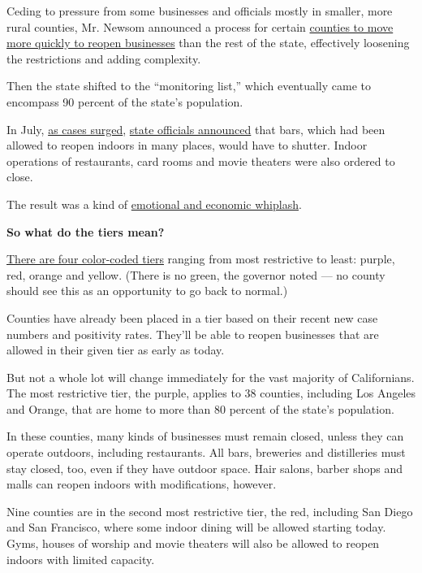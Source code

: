 Ceding to pressure from some businesses and officials mostly in smaller,
more rural counties, Mr. Newsom announced a process for certain
\href{https://www.nytimes3xbfgragh.onion/2020/05/19/us/california-reopening.html}{counties
to move more quickly to reopen businesses} than the rest of the state,
effectively loosening the restrictions and adding complexity.

Then the state shifted to the ``monitoring list,'' which eventually came
to encompass 90 percent of the state's population.

In July,
\href{https://www.nytimes3xbfgragh.onion/2020/07/23/us/california-coronavirus-new-york-cases.html}{as
cases surged},
\href{https://www.nytimes3xbfgragh.onion/2020/07/14/us/california-counties-reopening.html}{state
officials announced} that bars, which had been allowed to reopen indoors
in many places, would have to shutter. Indoor operations of restaurants,
card rooms and movie theaters were also ordered to close.

The result was a kind of
\href{https://www.nytimes3xbfgragh.onion/2020/07/23/us/california-covid-19-cases.html}{emotional
and economic whiplash}.

\textbf{So what do the tiers mean?}

\href{https://covid19.ca.gov/safer-economy/}{There are four color-coded
tiers} ranging from most restrictive to least: purple, red, orange and
yellow. (There is no green, the governor noted --- no county should see
this as an opportunity to go back to normal.)

Counties have already been placed in a tier based on their recent new
case numbers and positivity rates. They'll be able to reopen businesses
that are allowed in their given tier as early as today.

But not a whole lot will change immediately for the vast majority of
Californians. The most restrictive tier, the purple, applies to 38
counties, including Los Angeles and Orange, that are home to more than
80 percent of the state's population.

In these counties, many kinds of businesses must remain closed, unless
they can operate outdoors, including restaurants. All bars, breweries
and distilleries must stay closed, too, even if they have outdoor space.
Hair salons, barber shops and malls can reopen indoors with
modifications, however.

Nine counties are in the second most restrictive tier, the red,
including San Diego and San Francisco, where some indoor dining will be
allowed starting today. Gyms, houses of worship and movie theaters will
also be allowed to reopen indoors with limited capacity.

